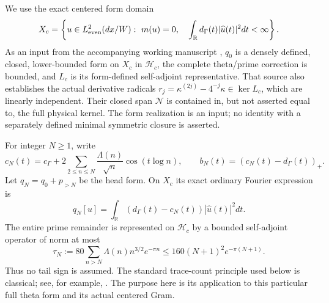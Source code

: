\documentclass[11pt]{article}
\newcommand{\R}{\mathbb R}\newcommand{\Hh}{\mathcal H}\newcommand{\Nn}{\mathcal N}\newcommand{\norm}[1]{\lVert#1\rVert}\newcommand{\ip}[2]{\langle #1,#2\rangle}\newcommand{\dom}{\operatorname{Dom}}
\begin{document}
We use the exact centered form domain
\[X_c=\left\{u\in L^2_{\rm even}(dx/W):\ m(u)=0,\quad\int_\R d_\Gamma(t)|\widehat u(t)|^2dt<\infty\right\}.
\]
As an input from the accompanying working manuscript \cite{source}, $q_0$ is a densely defined, closed, lower-bounded form on $X_c$ in $\Hh_c$, the complete theta/prime correction is bounded, and $L_c$ is its form-defined self-adjoint representative. That source also establishes the actual derivative radicals $r_j=\kappa^{(2j)}-4^{-j}\kappa\in\ker L_c$, which are linearly independent. Their closed span $\Nn$ is contained in, but not asserted equal to, the full physical kernel. The form realization is an input; no identity with a separately defined minimal symmetric closure is asserted.

For integer $N\ge1$, write
\begin{equation}\label{symbol}
 c_N(t)=c_\Gamma+2\sum_{2\le n\le N}\frac{\Lambda(n)}{\sqrt n}\cos(t\log n),\qquad
 b_N(t)=(c_N(t)-d_\Gamma(t))_+.
\end{equation}
Let $q_N=q_0+p_{>N}$ be the head form. On $X_c$ its exact ordinary Fourier expression is
\begin{equation}\label{head}
 q_N[u]=\int_\R(d_\Gamma(t)-c_N(t))|\widehat u(t)|^2dt.
\end{equation}
The entire prime remainder is represented on $\Hh_c$ by a bounded self-adjoint operator of norm at most \cite{indexnote}
\begin{equation}\label{tail}
 \tau_N:=80\sum_{n>N}\Lambda(n)n^{3/2}e^{-\pi n}
 \le160(N+1)^2e^{-\pi(N+1)}.
\end{equation}
Thus no tail sign is assumed. The standard trace-count principle used below is classical; see, for example, \cite{simon}. The purpose here is its application to this particular full theta form and its actual centered Gram.
\end{document}
